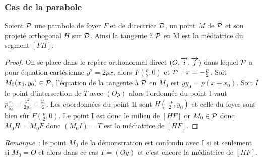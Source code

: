 \subsubsection{Cas de la parabole}
\begin{prop}
  Soient $\P$ une parabole de foyer $F$ et de directrice $\Dr$, un point $M$ de $\P$ et son projeté orthogonal $H$ sur $\Dr$. Ainsi la tangente à $\P$ en M est la médiatrice du segment $[FH]$.
\end{prop}
\begin{proof}
  On se place dans le repère orthonormal direct $\rond$ dans lequel $\P$ a pour équation cartésienne $y^2=2px$, alors $F\left(\frac{p}{2},0\right)$ et $\Dr{}~: x=-\frac{p}{2}$. Soit $M_0(x_0,y_0)\in\P$, l'équation de la tangente à $\P$ en $M_0$ est $yy_0=p(x+x_0)$. Soit $I$ le point d'intersection de $T$ avec $(Oy)$ alors l'ordonnée du point I vaut $p\frac{x_0}{y_0}=\frac{y_0^2}{2y_0}=\frac{y_0}{2}$. Les coordonnées du point H sont $H\left(\frac{-p}{2}, y_0\right)$ et celle du foyer sont bien sûr $F\left(\frac{p}{2},0\right)$. Le point I est donc le milieu de $[HF]$ or $M_0\in\P$ donc $M_0H=M_0F$ donc $(M_0I)=T$ est la médiatrice de $[HF]$.
\end{proof}
\emph{Remarque}~: le point $M_0$ de la démonstration est confondu avec I si et seulement si $M_0=O$ et alors dans ce cas $T=(Oy)$ et c'est encore la médiatrice de $[HF]$.

